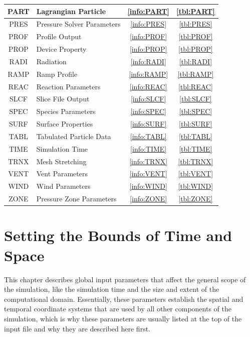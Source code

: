 \documentclass[11pt]{book}
\begin{document}
\begin{table}[ht]
\begin{center}
\begin{tabular}{|c|l|c|c|}
{\ct PART}  & Lagrangian Particle          & \ref{info:PART} & \ref{tbl:PART}  \\ \hline
{\ct PRES}  & Pressure Solver Parameters   & \ref{info:PRES} & \ref{tbl:PRES}  \\ \hline
{\ct PROF}  & Profile Output               & \ref{info:PROF} & \ref{tbl:PROF}  \\ \hline
{\ct PROP}  & Device Property              & \ref{info:PROP} & \ref{tbl:PROP}  \\ \hline
{\ct RADI}  & Radiation                    & \ref{info:RADI} & \ref{tbl:RADI}  \\ \hline
{\ct RAMP}  & Ramp Profile                 & \ref{info:RAMP} & \ref{tbl:RAMP}  \\ \hline
{\ct REAC}  & Reaction Parameters          & \ref{info:REAC} & \ref{tbl:REAC}  \\ \hline
{\ct SLCF}  & Slice File Output            & \ref{info:SLCF} & \ref{tbl:SLCF}  \\ \hline
{\ct SPEC}  & Species Parameters           & \ref{info:SPEC} & \ref{tbl:SPEC}  \\ \hline
{\ct SURF}  & Surface Properties           & \ref{info:SURF} & \ref{tbl:SURF}  \\ \hline
{\ct TABL}  & Tabulated Particle Data      & \ref{info:TABL} & \ref{tbl:TABL}  \\ \hline
{\ct TIME}  & Simulation Time              & \ref{info:TIME} & \ref{tbl:TIME}  \\ \hline
{\ct TRNX}  & Mesh Stretching              & \ref{info:TRNX} & \ref{tbl:TRNX}  \\ \hline
{\ct VENT}  & Vent Parameters              & \ref{info:VENT} & \ref{tbl:VENT}  \\ \hline
{\ct WIND}  & Wind Parameters              & \ref{info:WIND} & \ref{tbl:WIND}  \\ \hline
{\ct ZONE}  & Pressure Zone Parameters     & \ref{info:ZONE} & \ref{tbl:ZONE}  \\ \hline
\end{tabular}
\end{center}
\end{table}




\chapter{Setting the Bounds of Time and Space}

This chapter describes global input parameters that affect the general scope of the simulation, like
the simulation time and the size and extent of the computational domain. Essentially, these parameters
establish the spatial and temporal coordinate systems that are used by all other components of the simulation, which is
why these parameters are usually listed at the top of the input file and why they are described here first.
\end{document}
